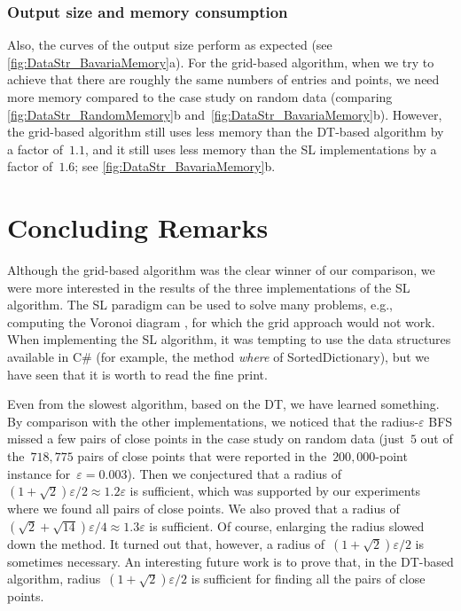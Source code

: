 \subsubsection{Output size and memory consumption}
Also, the curves of the output size perform as expected
(see \fig\ref{fig:DataStr_BavariaMemory}a). 
For the grid-based algorithm, when we try to achieve that 
there are roughly the same numbers of entries and points, 
we need more memory compared to the case study on random data
(comparing \figs\ref{fig:DataStr_RandomMemory}b
and~\ref{fig:DataStr_BavariaMemory}b). 
However, the grid-based algorithm still uses less memory 
than the DT-based algorithm by a factor of~$1.1$, 
and it still uses less memory than the SL 
implementations by a factor of~$1.6$;
see \fig\ref{fig:DataStr_BavariaMemory}b.





\section{Concluding Remarks}\label{sec:DataStr_Conclusion}
Although the grid-based algorithm was the clear winner of our 
comparison, we were more interested in the results of the three 
implementations of the SL algorithm. 
The SL paradigm can be used to solve many problems,
e.g., computing the Voronoi diagram 
\parencite{Fortune1987Voronoi}, 
for which the grid approach would not work. 
When implementing the SL algorithm, 
it was tempting to use the data structures 
available in C\# (for example, the 
method \emph{where} of SortedDictionary), 
but we have seen that it is worth to read the fine print.



Even from the slowest algorithm, based on the DT, 
we have learned something. 
By comparison with the other implementations, 
we noticed that 
the radius-$\varepsilon$ BFS missed a few pairs of close points
in the case study on random data 
(just~$5$ out of the~$718{,}775$ pairs of close points
that were reported in the~$200{,}000$-point instance 
for~$\varepsilon =0.003$). 
Then we conjectured that 
a radius of~$(1+\sqrt{2})\varepsilon /2 
\approx 1.2\varepsilon$ is sufficient, 
which was supported by our experiments 
where we found all pairs of close points. 
We also proved that 
a radius of~$(\sqrt{2}+\sqrt{14})\varepsilon /4
\approx 1.3\varepsilon$ is sufficient. 
Of course, enlarging the radius slowed down the method. 
It turned out that, however, 
a radius of~$(1+\sqrt{2})\varepsilon /2$ 
is sometimes necessary.
An interesting future work is to prove that,
in the DT-based algorithm,
radius~$(1+\sqrt{2})\varepsilon /2$ is sufficient 
for finding all the pairs of close points.

